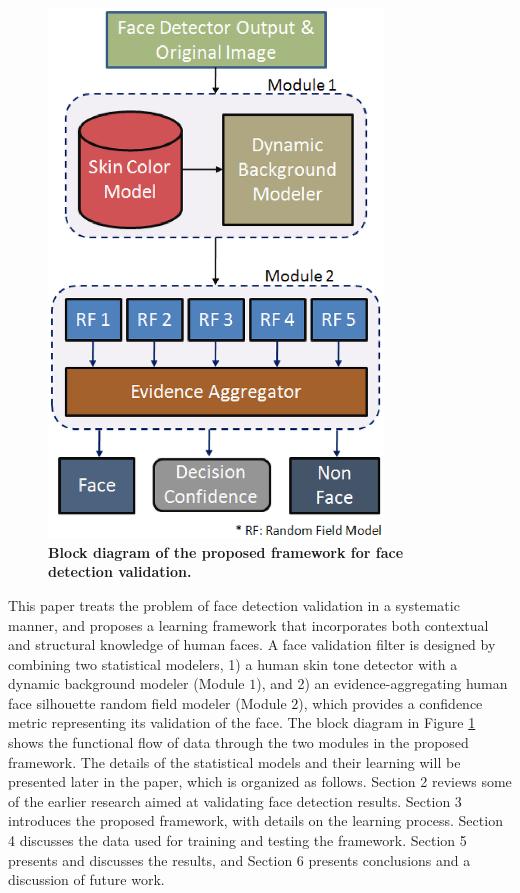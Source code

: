 \documentclass[times, 10pt,twocolumn]{article}
\begin{document}
\begin{figure}[h]
\centering
\includegraphics[width=3.5in]{Figure2.eps}
\caption{{\bf {\selectfont Block diagram of the
proposed framework for face detection validation.}}}
\label{Fig:BlockDiagram}
\end{figure}

This paper treats the problem of face detection validation in a
systematic manner, and proposes a learning framework that
incorporates both contextual and structural knowledge of human
faces. A face validation filter is designed by combining two
statistical modelers, 1) a human skin tone detector with a dynamic
background modeler (Module $1$), and 2) an evidence-aggregating
human face silhouette random field modeler (Module $2$), which
provides a confidence metric representing its validation of the
face. The block diagram in Figure \ref{Fig:BlockDiagram} shows the
functional flow of data through the two modules in the proposed
framework. The details of the statistical models and their learning
will be presented later in the paper, which is organized as follows.
Section 2 reviews some of the earlier research aimed at validating
face detection results. Section 3 introduces the proposed framework,
with details on the learning process. Section 4 discusses the data
used for training and testing the framework. Section 5 presents and
discusses the results, and Section 6 presents conclusions and a
discussion of future work.
\end{document}
